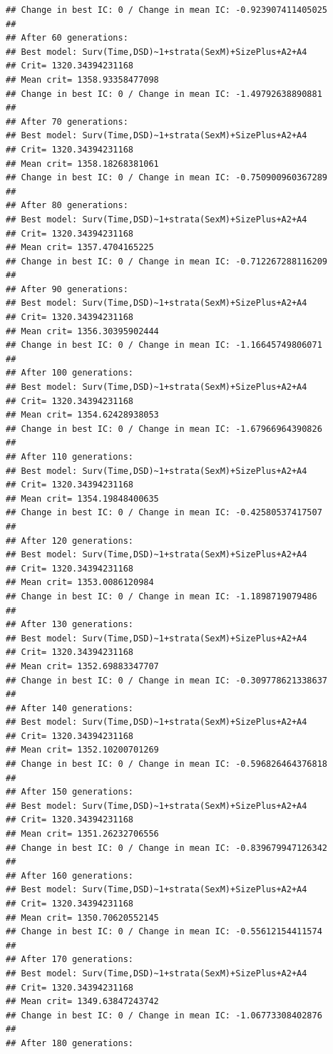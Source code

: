 \documentclass{article}\usepackage[]{graphicx}\usepackage[]{color}
\makeatletter
\newenvironment{kframe}{%
 \def\at@end@of@kframe{}%
 \ifinner\ifhmode%
  \def\at@end@of@kframe{\end{minipage}}%
  \begin{minipage}{\columnwidth}%
 \fi\fi%
 \def\FrameCommand##1{\hskip\@totalleftmargin \hskip-\fboxsep
 \colorbox{shadecolor}{##1}\hskip-\fboxsep
     \hskip-\linewidth \hskip-\@totalleftmargin \hskip\columnwidth}%
 \MakeFramed {\advance\hsize-\width
   \@totalleftmargin\z@ \linewidth\hsize
   \@setminipage}}%
 {\par\unskip\endMakeFramed%
 \at@end@of@kframe}
\newenvironment{knitrout}{}{} %
\makeatother
\begin{document}
\begin{knitrout}
\begin{kframe}
\begin{verbatim}
## Change in best IC: 0 / Change in mean IC: -0.923907411405025
## 
## After 60 generations:
## Best model: Surv(Time,DSD)~1+strata(SexM)+SizePlus+A2+A4
## Crit= 1320.34394231168
## Mean crit= 1358.93358477098
## Change in best IC: 0 / Change in mean IC: -1.49792638890881
## 
## After 70 generations:
## Best model: Surv(Time,DSD)~1+strata(SexM)+SizePlus+A2+A4
## Crit= 1320.34394231168
## Mean crit= 1358.18268381061
## Change in best IC: 0 / Change in mean IC: -0.750900960367289
## 
## After 80 generations:
## Best model: Surv(Time,DSD)~1+strata(SexM)+SizePlus+A2+A4
## Crit= 1320.34394231168
## Mean crit= 1357.4704165225
## Change in best IC: 0 / Change in mean IC: -0.712267288116209
## 
## After 90 generations:
## Best model: Surv(Time,DSD)~1+strata(SexM)+SizePlus+A2+A4
## Crit= 1320.34394231168
## Mean crit= 1356.30395902444
## Change in best IC: 0 / Change in mean IC: -1.16645749806071
## 
## After 100 generations:
## Best model: Surv(Time,DSD)~1+strata(SexM)+SizePlus+A2+A4
## Crit= 1320.34394231168
## Mean crit= 1354.62428938053
## Change in best IC: 0 / Change in mean IC: -1.67966964390826
## 
## After 110 generations:
## Best model: Surv(Time,DSD)~1+strata(SexM)+SizePlus+A2+A4
## Crit= 1320.34394231168
## Mean crit= 1354.19848400635
## Change in best IC: 0 / Change in mean IC: -0.42580537417507
## 
## After 120 generations:
## Best model: Surv(Time,DSD)~1+strata(SexM)+SizePlus+A2+A4
## Crit= 1320.34394231168
## Mean crit= 1353.0086120984
## Change in best IC: 0 / Change in mean IC: -1.1898719079486
## 
## After 130 generations:
## Best model: Surv(Time,DSD)~1+strata(SexM)+SizePlus+A2+A4
## Crit= 1320.34394231168
## Mean crit= 1352.69883347707
## Change in best IC: 0 / Change in mean IC: -0.309778621338637
## 
## After 140 generations:
## Best model: Surv(Time,DSD)~1+strata(SexM)+SizePlus+A2+A4
## Crit= 1320.34394231168
## Mean crit= 1352.10200701269
## Change in best IC: 0 / Change in mean IC: -0.596826464376818
## 
## After 150 generations:
## Best model: Surv(Time,DSD)~1+strata(SexM)+SizePlus+A2+A4
## Crit= 1320.34394231168
## Mean crit= 1351.26232706556
## Change in best IC: 0 / Change in mean IC: -0.839679947126342
## 
## After 160 generations:
## Best model: Surv(Time,DSD)~1+strata(SexM)+SizePlus+A2+A4
## Crit= 1320.34394231168
## Mean crit= 1350.70620552145
## Change in best IC: 0 / Change in mean IC: -0.55612154411574
## 
## After 170 generations:
## Best model: Surv(Time,DSD)~1+strata(SexM)+SizePlus+A2+A4
## Crit= 1320.34394231168
## Mean crit= 1349.63847243742
## Change in best IC: 0 / Change in mean IC: -1.06773308402876
## 
## After 180 generations:

\end{verbatim}
\end{kframe}
\end{knitrout}
\end{document}
